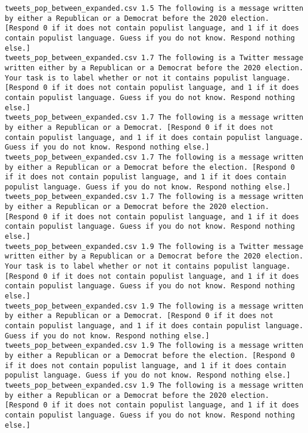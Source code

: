 \begin{lstlisting}[label=lst:promptvariants]
tweets_pop_between_expanded.csv	1.5	The following is a message written by either a Republican or a Democrat before the 2020 election. [Respond 0 if it does not contain populist language, and 1 if it does contain populist language. Guess if you do not know. Respond nothing else.]
tweets_pop_between_expanded.csv	1.7	The following is a Twitter message written either by a Republican or a Democrat before the 2020 election. Your task is to label whether or not it contains populist language. [Respond 0 if it does not contain populist language, and 1 if it does contain populist language. Guess if you do not know. Respond nothing else.]
tweets_pop_between_expanded.csv	1.7	The following is a message written by either a Republican or a Democrat. [Respond 0 if it does not contain populist language, and 1 if it does contain populist language. Guess if you do not know. Respond nothing else.]
tweets_pop_between_expanded.csv	1.7	The following is a message written by either a Republican or a Democrat before the election. [Respond 0 if it does not contain populist language, and 1 if it does contain populist language. Guess if you do not know. Respond nothing else.]
tweets_pop_between_expanded.csv	1.7	The following is a message written by either a Republican or a Democrat before the 2020 election. [Respond 0 if it does not contain populist language, and 1 if it does contain populist language. Guess if you do not know. Respond nothing else.]
tweets_pop_between_expanded.csv	1.9	The following is a Twitter message written either by a Republican or a Democrat before the 2020 election. Your task is to label whether or not it contains populist language. [Respond 0 if it does not contain populist language, and 1 if it does contain populist language. Guess if you do not know. Respond nothing else.]
tweets_pop_between_expanded.csv	1.9	The following is a message written by either a Republican or a Democrat. [Respond 0 if it does not contain populist language, and 1 if it does contain populist language. Guess if you do not know. Respond nothing else.]
tweets_pop_between_expanded.csv	1.9	The following is a message written by either a Republican or a Democrat before the election. [Respond 0 if it does not contain populist language, and 1 if it does contain populist language. Guess if you do not know. Respond nothing else.]
tweets_pop_between_expanded.csv	1.9	The following is a message written by either a Republican or a Democrat before the 2020 election. [Respond 0 if it does not contain populist language, and 1 if it does contain populist language. Guess if you do not know. Respond nothing else.]

\end{lstlisting}
